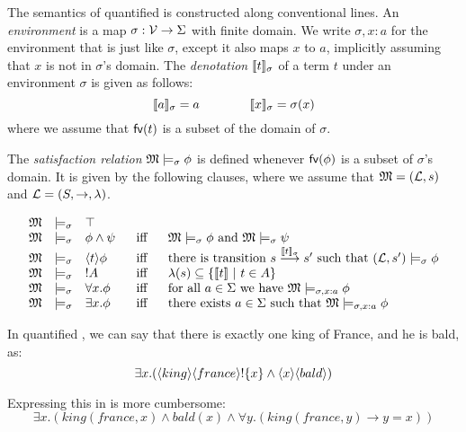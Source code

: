 \begin{definition}
The semantics of quantified \cathoristic{} is constructed along
conventional lines. An \emph{environment} is a map $\sigma : \mathcal{V}
\rightarrow \Sigma$ with finite domain.  We write $\sigma, x : a$ for
the environment that is just like $\sigma$, except it also maps $x$ to
$a$, implicitly assuming that $x$ is not in $\sigma$'s domain.  The
\emph{denotation} $\lbrack\!\lbrack t \rbrack\!\rbrack_{\sigma}$ of a term $t$ under an
environment $\sigma$ is given as follows:
\[
   \lbrack\!\lbrack a \rbrack\!\rbrack_{\sigma} = a
      \qquad\qquad
   \lbrack\!\lbrack x \rbrack\!\rbrack_{\sigma} = \sigma(x)
\]
where we assume that $\mathsf{fv}(t)$ is a subset of the domain of $\sigma$.

The \emph{satisfaction
  relation} $\frak{M} \models_{\sigma} \phi$ is defined whenever
$\mathsf{fv}(\phi)$ is a subset of $\sigma$'s domain. It is given by the
following clauses, where we assume that $\frak{M} = (\mathcal{L}, s)$ and $\mathcal{L} =
(S, \rightarrow, \lambda)$.

\[
\begin{array}{lclcl}
  \MMM & \models_{\sigma} & \top   \\
  \MMM & \models_{\sigma} & \phi \AND \psi &\ \mbox{ iff } \ & \MMM  \models_{\sigma} \phi \mbox { and } \MMM \models_{\sigma} \psi  \\
  \MMM & \models_{\sigma} & \langle t \rangle \phi & \mbox{ iff } & \text{there is transition } s \TRANS{\SEMB{t}_{\sigma}} s' \mbox { such that } (\LLL, s') \models_{\sigma} \phi  \\
  \MMM & \models_{\sigma} & \fBang A &\mbox{ iff } & \lambda(s) \subseteq \{\SEMB{t}\ |\ t \in A\} \\
  \MMM & \models_{\sigma} & \forall x.\phi &\mbox{ iff } & \text{for all} \ a \in \Sigma\ \text{we have}\ \MMM \models_{\sigma, x : a} \phi \\
  \MMM & \models_{\sigma} & \exists x.\phi &\mbox{ iff } & \text{there exists} \ a \in \Sigma \ \text{such that}\  \MMM \models_{\sigma, x : a} \phi
\end{array}
\]


\end{definition}

\NI In quantified \cathoristic{}, we can say that there is exactly one
king of France, and he is bald, as:
\[
   \exists x . (\langle king \rangle \langle france \rangle ! \{x\} \land \langle x \rangle \langle bald \rangle )
\]

\NI Expressing this in \fol{} is more cumbersome:
\[
   \exists x. ( king(france, x) \land bald(x) \land \forall y. ( king(france, y) \rightarrow y = x ))
\]

